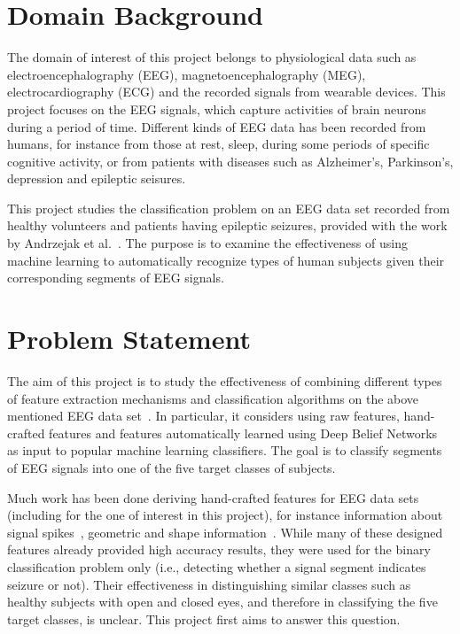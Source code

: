 \documentclass[12pt]{article}
\begin{document}
\maketitle

\section{Domain Background}

\noindent
The domain of interest of this project belongs to physiological data such as electroencephalography (EEG), magnetoencephalography (MEG), electrocardiography (ECG) and the recorded signals from wearable devices. This project focuses on the EEG signals, which capture activities of brain neurons during a period of time. Different kinds of EEG data has been recorded from humans, for instance from those at rest, sleep, during some periods of specific cognitive activity, or from patients with diseases such as Alzheimer's, Parkinson's, depression and epileptic seisures. 


This project studies the classification problem on an EEG data set recorded from healthy volunteers and patients having epileptic seizures, provided with the work by Andrzejak et al.~\cite{andrzejak2001indications}. The purpose is to examine the effectiveness of using machine learning to automatically recognize types of human subjects given their corresponding segments of EEG signals. 

\section{Problem Statement}

The aim of this project is to study the effectiveness of combining different types of feature extraction mechanisms and classification algorithms on the above mentioned EEG data set~\cite{andrzejak2001indications}. In particular, it considers using raw features, hand-crafted features and features automatically learned using Deep Belief Networks~\cite{hinton2006reducing} as input to popular machine learning classifiers. The goal is to classify segments of EEG signals into one of the five target classes of subjects.

Much work has been done deriving hand-crafted features for EEG data sets (including for the one of interest in this project), for instance information about signal spikes~\cite{nigam2004neural}, geometric and shape information~\cite{wulsin2011modeling}. While many of these designed features already provided high accuracy results, they were used for the binary classification problem only (i.e., detecting whether a signal segment indicates seizure or not). Their effectiveness in distinguishing similar classes such as healthy subjects with open and closed eyes, and therefore in classifying the five target classes, is unclear. This project first aims to answer this question.
\end{document}
